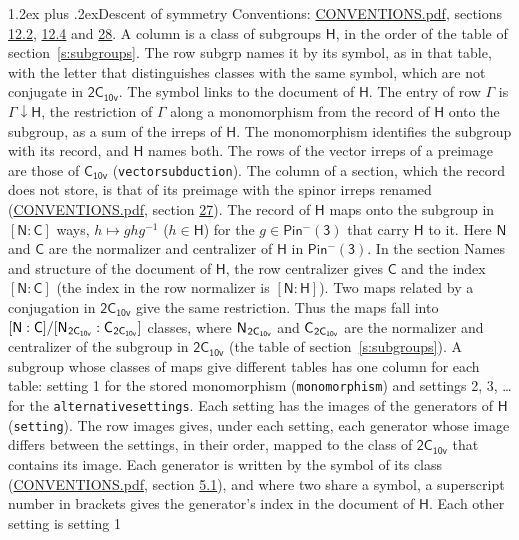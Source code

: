 \documentclass[10pt,a4paper]{article}
\makeatletter
\renewcommand\section{\@startsection{section}{1}{\z@}{-3ex plus -1ex minus -.2ex}%
  {1.2ex plus .2ex}{\normalfont\large\sffamily\bfseries\color{parttitle}}}
\numberwithin{equation}{section}
\newcommand{\grp}[1]{\mathsf{#1}}
\newcommand{\grpindex}[2]{[#1 : #2]}
\newcommand{\restr}[2]{#1\!\downarrow#2}
\newcommand{\hairsp}{\mkern1mu}
\makeatother
\begin{document}
\section{Descent of symmetry}\label{s:subduction}
Conventions: \href{../../CONVENTIONS.pdf}{CONVENTIONS.pdf}, sections \href{../../../rotation/CONVENTIONS.pdf\#conv.12.2}{12.2}, \href{../../../rotation/CONVENTIONS.pdf\#conv.12.4}{12.4} and \href{../../CONVENTIONS.pdf\#conv.28}{28}.
A column is a class of subgroups $\grp{H}$, in the order of the table of section~\ref{s:subgroups}. The row subgrp names it by its symbol, as in that table, with the letter that distinguishes classes with the same symbol, which are not conjugate in $\grp{2C_{10v}}$. The symbol links to the document of $\grp{H}$. The entry of row $\Gamma$ is $\restr{\Gamma}{\grp{H}}$, the restriction of $\Gamma$ along a monomorphism from the record of $\grp{H}$ onto the subgroup, as a sum of the irreps of $\grp{H}$. The monomorphism identifies the subgroup with its record, and $\grp{H}$ names both. The rows of the vector irreps of a preimage are those of \href{../../../rotation/data/pdf/C10v.pdf}{$\grp{C_{10v}}$} (\texttt{vectorsubduction}). The column of a section, which the record does not store, is that of its preimage with the spinor irreps renamed (\href{../../CONVENTIONS.pdf}{CONVENTIONS.pdf}, section \href{../../CONVENTIONS.pdf\#conv.27}{27}). \label{n:group.normalizer.o3}\label{n:group.centralizer.o3}\label{n:element.h}The record of $\grp{H}$ maps onto the subgroup in $\grpindex{\grp{N}}{\grp{C}}$ ways, $h \mapsto g h g^{-1}$ ($h \in \grp{H}$) for the $g \in \grp{Pin^{-}(3)}$ that carry $\grp{H}$ to it. Here $\grp{N}$ and $\grp{C}$ are the normalizer and centralizer of $\grp{H}$ in \href{Pinminus3.pdf}{$\grp{Pin^{-}(3)}$}. In the section Names and structure of the document of $\grp{H}$, the row centralizer gives $\grp{C}$ and the index $\grpindex{\grp{N}}{\grp{C}}$ (the index in the row normalizer is $\grpindex{\grp{N}}{\grp{H}}$). Two maps related by a conjugation in $\grp{2C_{10v}}$ give the same restriction. Thus the maps fall into $\grpindex{\grp{N}}{\grp{C}}/\grpindex{\grp{N}_{\hairsp \grp{2C_{10v}}}}{\grp{C}_{\hairsp \grp{2C_{10v}}}}$ classes, where $\grp{N}_{\hairsp \grp{2C_{10v}}}$ and $\grp{C}_{\hairsp \grp{2C_{10v}}}$ are the normalizer and centralizer of the subgroup in $\grp{2C_{10v}}$ (the table of section~\ref{s:subgroups}). \label{n:head.setting}A subgroup whose classes of maps give different tables has one column for each table: setting 1 for the stored monomorphism (\texttt{monomorphism}) and settings 2, 3, \dots{} for the \texttt{alternativesettings}. Each setting has the images of the generators of $\grp{H}$ (\texttt{setting}). \label{n:head.images}The row images gives, under each setting, each generator whose image differs between the settings, in their order, mapped to the class of $\grp{2C_{10v}}$ that contains its image. Each generator is written by the symbol of its class (\href{../../CONVENTIONS.pdf}{CONVENTIONS.pdf}, section \href{../../../rotation/CONVENTIONS.pdf\#conv.5.1}{5.1}), and where two share a symbol, a superscript number in brackets gives the generator's index in the document of $\grp{H}$. \label{n:irrep.Delta}Each other setting is setting 1 
\end{document}
